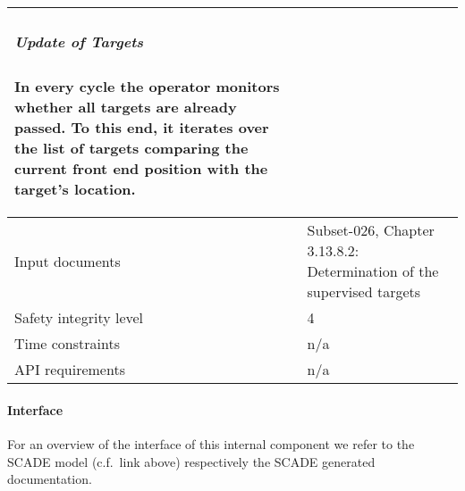 \begin{longtable}{p{}p{}}
\subparagraph*{Update of Targets}
In every cycle the operator monitors whether all targets are already passed. To this end, it iterates over the list of targets comparing the current front end position with the target's location. \\
\midrule
Input documents	& 
Subset-026, Chapter 3.13.8.2: Determination of the supervised targets \\
\midrule
Safety integrity level		& 4 \\
\midrule
Time constraints		& n/a \\
\midrule
API requirements 		& n/a \\
\bottomrule
\end{longtable}


\paragraph{Interface}

For an overview of the interface of this internal component we refer to the SCADE model (c.f.~link above) respectively the SCADE generated documentation.